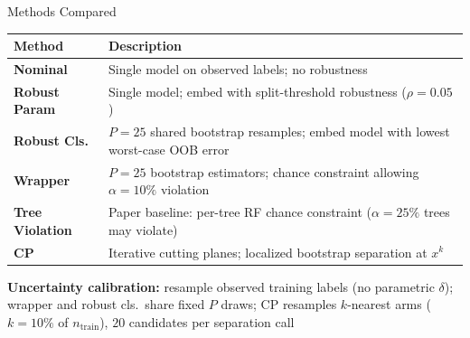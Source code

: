 \documentclass{beamer}
\begin{document}
\begin{frame}{Methods Compared}
  \footnotesize
  \renewcommand{\arraystretch}{1.2}
  \begin{tabular}{p{2.3cm}p{7.7cm}}
      \toprule
      \textbf{Method} & \textbf{Description} \\
      \midrule
      \textbf{Nominal} &
          Single model on observed labels;
          no robustness \\
      \textbf{Robust Param} &
          Single model; embed with split-threshold
          robustness ($\rho{=}0.05$) \\
      \textbf{Robust Cls.} &
          $P{=}25$ shared bootstrap resamples;
          embed model with lowest worst-case OOB error \\
      \textbf{Wrapper} &
          $P{=}25$ bootstrap estimators; chance constraint
          allowing $\alpha{=}10\%$ violation \\
      \textbf{Tree Violation} &
          Paper baseline: per-tree RF chance constraint
          ($\alpha{=}25\%$ trees may violate) \\
      \textbf{CP} &
          Iterative cutting planes;
          localized bootstrap separation at $x^k$ \\
      \bottomrule
  \end{tabular}
  
  \medskip
  \normalsize
  \textbf{Uncertainty calibration:}
  resample observed training labels (no parametric $\delta$);
  wrapper and robust cls.\ share fixed $P$ draws;
  CP resamples $k$-nearest arms ($k{=}10\%$ of $n_{\mathrm{train}}$),
  $20$ candidates per separation call
  
\end{frame}
\end{document}
